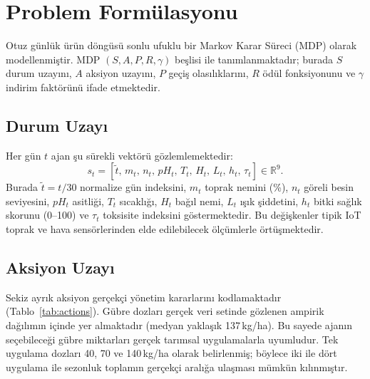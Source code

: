 \documentclass[10pt,twocolumn,a4paper]{article}
\begin{document}
\section{Problem Form\"ulasyonu}
Otuz g\"unl\"uk \"ur\"un d\"ong\"us\"u sonlu ufuklu bir Markov Karar S\"ureci (MDP) olarak modellenmi\c{s}tir. MDP $(S,A,P,R,\gamma)$ be\c{s}lisi ile tan{\i}mlanmaktad{\i}r; burada $S$ durum uzay{\i}n{\i}, $A$ aksiyon uzay{\i}n{\i}, $P$ ge\c{c}i\c{s} olas{\i}l{\i}klar{\i}n{\i}, $R$ \"od\"ul fonksiyonunu ve $\gamma$ indirim fakt\"or\"un\"u ifade etmektedir.

\subsection{Durum Uzay{\i}}
Her g\"un $t$ ajan \c{s}u s\"urekli vekt\"or\"u g\"ozlemlemektedir:
\begin{equation}
s_t = [\tilde{t},\, m_t,\, n_t,\, pH_t,\, T_t,\, H_t,\, L_t,\, h_t,\, \tau_t] \in \mathbb{R}^9.
\end{equation}
Burada $\tilde{t}=t/30$ normalize g\"un indeksini, $m_t$ toprak nemini (\%), $n_t$ g\"oreli besin seviyesini, $pH_t$ asitli\u{g}i, $T_t$ s{\i}cakl{\i}\u{g}{\i}, $H_t$ ba\u{g}{\i}l nemi, $L_t$ {\i}\c{s}{\i}k \c{s}iddetini, $h_t$ bitki sa\u{g}l{\i}k skorunu (0--100) ve $\tau_t$ toksisite indeksini g\"ostermektedir. Bu de\u{g}i\c{s}kenler tipik IoT toprak ve hava sens\"orlerinden elde edilebilecek \"ol\c{c}\"umlerle \"ort\"u\c{s}mektedir.

\subsection{Aksiyon Uzay{\i}}
Sekiz ayr{\i}k aksiyon ger\c{c}ek\c{c}i y\"onetim kararlar{\i}n{\i} kodlamaktad{\i}r (Tablo~\ref{tab:actions}). G\"ubre dozlar{\i} ger\c{c}ek veri setinde g\"ozlenen ampirik da\u{g}{\i}l{\i}m{\i}n i\c{c}inde yer almaktad{\i}r (medyan yakla\c{s}{\i}k 137\,kg/ha). Bu sayede ajan{\i}n se\c{c}ebilece\u{g}i g\"ubre miktarlar{\i} ger\c{c}ek tar{\i}msal uygulamalarla uyumludur. Tek uygulama dozlar{\i} 40, 70 ve 140\,kg/ha olarak belirlenmi\c{s}; b\"oylece iki ile d\"ort uygulama ile sezonluk toplam{\i}n ger\c{c}ek\c{c}i aral{\i}\u{g}a ula\c{s}mas{\i} m\"umk\"un k{\i}l{\i}nm{\i}\c{s}t{\i}r.
\end{document}
